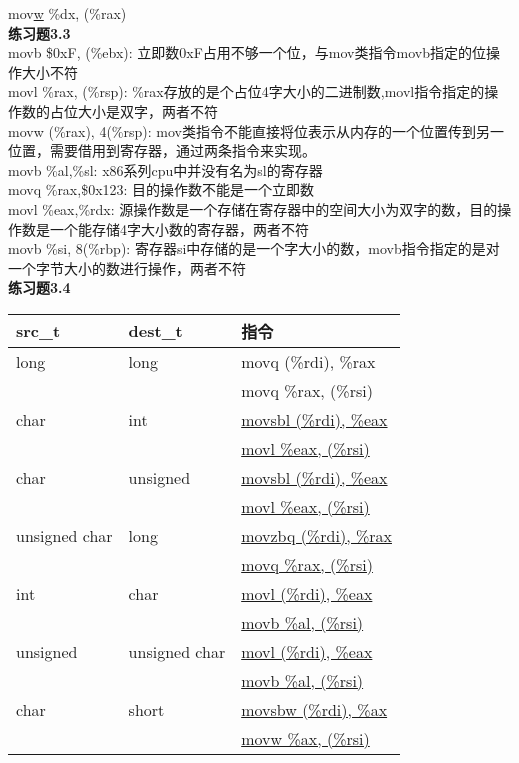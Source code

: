 \documentclass{article}
\begin{document}
\begin{CJK}{UTF8}{uyhei}
mov\underline{w} \%dx, (\%rax)	\\[3ex]
\textbf{练习题3.3}	\\[2ex]
movb \$0xF, (\%ebx): 立即数0xF占用不够一个位，与mov类指令movb指定的位操作大小不符	\\
movl \%rax, (\%rsp): \%rax存放的是个占位4字大小的二进制数,movl指令指定的操作数的占位大小是双字，两者不符	\\
movw (\%rax), 4(\%rsp): mov类指令不能直接将位表示从内存的一个位置传到另一位置，需要借用到寄存器，通过两条指令来实现。	\\
movb \%al,\%sl: x86系列cpu中并没有名为sl的寄存器	\\
movq \%rax,\$0x123: 目的操作数不能是一个立即数	\\
movl \%eax,\%rdx: 源操作数是一个存储在寄存器中的空间大小为双字的数，目的操作数是一个能存储4字大小数的寄存器，两者不符	\\
movb \%si, 8(\%rbp): 寄存器si中存储的是一个字大小的数，movb指令指定的是对一个字节大小的数进行操作，两者不符	\\[3ex]
\textbf{练习题3.4}	\\[2ex]
\begin{table}[htbp]
\centering
\begin{tabular}{|m{8em}<{\centering}|m{8em}<{\centering}|m{12em}<{\centering}|}
	\hline
	src\_t	&	dest\_t	&	指令	\\
	\hline
	long	&	long	&	movq (\%rdi), \%rax	\\
		&		&	movq \%rax, (\%rsi)	\\
	char	&	int	&	\underline{movsbl (\%rdi), \%eax}	\\
	&	&	\underline{movl \%eax, (\%rsi)}	\\
	char	&	unsigned	&	\underline{movsbl (\%rdi), \%eax}	\\
	&	&	\underline{movl \%eax, (\%rsi)}	\\
	unsigned char	&	long	&	\underline{movzbq (\%rdi), \%rax}	\\
	&	&	\underline{movq \%rax, (\%rsi)}	\\
	int	&	char	&	\underline{movl (\%rdi), \%eax}	\\
	&	&	\underline{movb \%al, (\%rsi)}	\\
	unsigned	&	unsigned char	&	\underline{movl (\%rdi), \%eax}	\\
	&	&	\underline{movb \%al, (\%rsi)}	\\
	char	&	short	&	\underline{movsbw (\%rdi), \%ax}	\\
	&	&	\underline{movw \%ax, (\%rsi)}	\\

\end{tabular}
\end{table}
\end{CJK}
\end{document}
